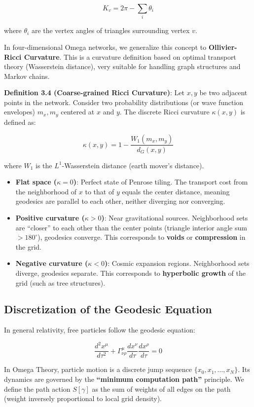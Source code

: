 \[K_v = 2\pi - \sum_{i} \theta_i\]

where $\theta_i$ are the vertex angles of triangles surrounding vertex $v$.

In four-dimensional Omega networks, we generalize this concept to \textbf{Ollivier-Ricci Curvature}. This is a curvature definition based on optimal transport theory (Wasserstein distance), very suitable for handling graph structures and Markov chains.

\textbf{Definition 3.4 (Coarse-grained Ricci Curvature)}:
Let $x, y$ be two adjacent points in the network. Consider two probability distributions (or wave function envelopes) $m_x, m_y$ centered at $x$ and $y$. The discrete Ricci curvature $\kappa(x, y)$ is defined as:

\[\kappa(x, y) = 1 - \frac{W_1(m_x, m_y)}{d_G(x, y)}\]

where $W_1$ is the $L^1$-Wasserstein distance (earth mover's distance).

\begin{itemize}
\item \textbf{Flat space ($\kappa = 0$)}: Perfect state of Penrose tiling. The transport cost from the neighborhood of $x$ to that of $y$ equals the center distance, meaning geodesics are parallel to each other, neither diverging nor converging.
\item \textbf{Positive curvature ($\kappa > 0$)}: Near gravitational sources. Neighborhood sets are ``closer'' to each other than the center points (triangle interior angle sum $> 180^\circ$), geodesics converge. This corresponds to \textbf{voids} or \textbf{compression} in the grid.
\item \textbf{Negative curvature ($\kappa < 0$)}: Cosmic expansion regions. Neighborhood sets diverge, geodesics separate. This corresponds to \textbf{hyperbolic growth} of the grid (such as tree structures).
\end{itemize}

\subsection{Discretization of the Geodesic Equation}

In general relativity, free particles follow the geodesic equation:

\[\frac{d^2 x^\mu}{d\tau^2} + \Gamma^\mu_{\nu\rho} \frac{dx^\nu}{d\tau} \frac{dx^\rho}{d\tau} = 0\]

In Omega Theory, particle motion is a discrete jump sequence $\{x_0, x_1, \dots, x_N\}$. Its dynamics are governed by the \textbf{``minimum computation path''} principle.
We define the path action $S[\gamma]$ as the sum of weights of all edges on the path (weight inversely proportional to local grid density).

